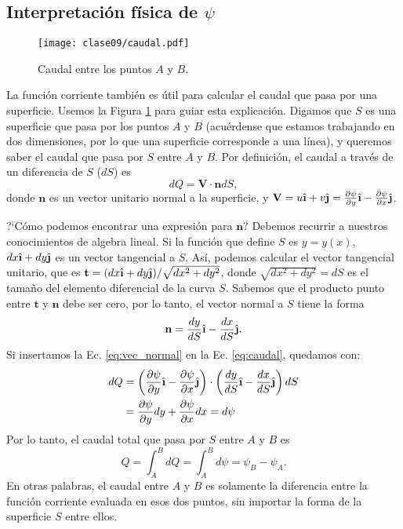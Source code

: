 \subsection*{Interpretación física de $\psi$}

\begin{figure}[!h]
\centering
\texttt{[image: clase09/caudal.pdf]}
\caption{Caudal entre los puntos $A$ y $B$.}
\label{fig:caudal}
\end{figure}

La función corriente también es útil para calcular el caudal que pasa por una superficie.
Usemos la Figura \ref{fig:caudal} para guiar esta explicación.
Digamos que $S$ es una superficie que pasa por los puntos $A$ y $B$ (acuérdense que estamos trabajando en dos dimensiones, por lo que una superficie corresponde a una línea), y queremos saber el caudal que pasa por $S$ entre $A$ y $B$.
Por definición, el caudal a través de un diferencia de $S$ ($dS$) es 
%
\begin{equation}\label{eq:caudal}
dQ = \mathbf{V}\cdot\mathbf{n}dS,
\end{equation}
%
donde $\mathbf{n}$ es un vector unitario normal a la superficie, y $\mathbf{V}=u\ihat+v\jhat = \frac{\partial \psi}{\partial y} \ihat -\frac{\partial \psi}{\partial x}\jhat$.

\mbox{?`}Cómo podemos encontrar una expresión para $\mathbf{n}$? Debemos recurrir a nuestros conocimientos de algebra lineal.
Si la función que define $S$ es $y=y(x)$, $dx\ihat+dy\jhat$ es un vector tangencial a $S$.
Así, podemos calcular el vector tangencial unitario, que es $\mathbf{t}=(dx\ihat+dy\jhat)/\sqrt{dx^2+dy^2}$, donde $\sqrt{dx^2+dy^2}=dS$ es el tamaño del elemento diferencial de la curva $S$.
Sabemos que el producto punto entre $\mathbf{t}$ y $\mathbf{n}$ debe ser cero, por lo tanto, el vector normal a $S$ tiene la forma
%
\begin{equation}\label{eq:vec_normal}
\mathbf{n} = \frac{dy}{dS}\ihat - \frac{dx}{dS}\jhat.
\end{equation}
%
Si insertamos la Ec. \eqref{eq:vec_normal} en la Ec. \eqref{eq:caudal}, quedamos con:
%
\begin{align}
dQ &= \left(\frac{\partial \psi}{\partial y} \ihat -\frac{\partial \psi}{\partial x}\jhat\right)\cdot\left( \frac{dy}{dS}\ihat - \frac{dx}{dS}\jhat\right)dS\nonumber\\
   &= \frac{\partial \psi}{\partial y}dy +\frac{\partial \psi}{\partial x}dx = d\psi
\end{align}
%
Por lo tanto, el caudal total que pasa por $S$ entre $A$ y $B$ es
\begin{equation}\label{eq:caudal_psi}
Q=\int_A^BdQ = \int_A^Bd\psi = \psi_B-\psi_A.
\end{equation}
%
En otras palabras, el caudal entre $A$ y $B$ es solamente la diferencia entre la función corriente evaluada en esos dos puntos, sin importar la forma de la superficie $S$ entre ellos.

